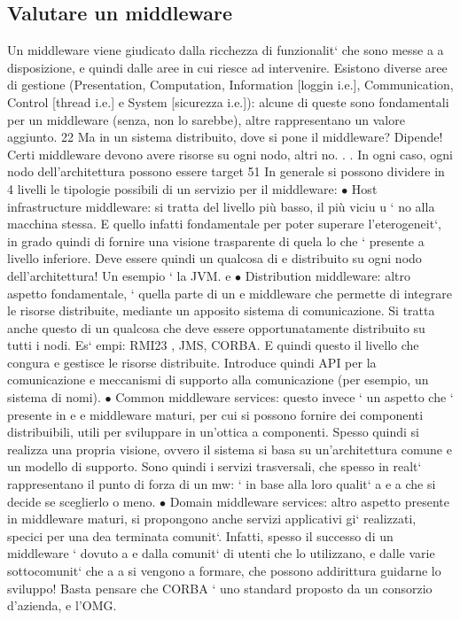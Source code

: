 \documentclass[a4paper,12pt]{article}
\begin{document}
\subsection{Valutare un middleware}
Un middleware viene giudicato dalla ricchezza di funzionalit` che sono messe a
a
disposizione, e quindi dalle aree in cui riesce ad intervenire. Esistono diverse
aree di gestione (Presentation, Computation, Information [loggin i.e.], Communication, Control [thread i.e.] e System
[sicurezza i.e.]): alcune di queste sono
fondamentali per un middleware (senza, non lo sarebbe), altre rappresentano
un valore aggiunto.
22 Ma in un sistema distribuito, dove si pone il middleware? Dipende! Certi middleware
devono avere risorse su ogni nodo, altri no. . . In ogni caso, ogni nodo dell'architettura possono
essere target
51
In generale si possono dividere in 4 livelli le tipologie possibili di un servizio
per il middleware:
$\bullet$ Host infrastructure middleware: si tratta del livello più basso, il più viciu
u
`
no alla macchina stessa. E quello infatti fondamentale per poter superare
l'eterogeneit`, in grado quindi di fornire una visione trasparente di quela
lo che ` presente a livello inferiore. Deve essere quindi un qualcosa di
e
distribuito su ogni nodo dell'architettura! Un esempio ` la JVM.
e
$\bullet$ Distribution middleware: altro aspetto fondamentale, ` quella parte di un
e
middleware che permette di integrare le risorse distribuite, mediante un
apposito sistema di comunicazione. Si tratta anche questo di un qualcosa che deve essere opportunatamente distribuito su
tutti i nodi. Es`
empi: RMI23 , JMS, CORBA. E quindi questo il livello che congura e
gestisce le risorse distribuite. Introduce quindi API per la comunicazione
e meccanismi di supporto alla comunicazione (per esempio, un sistema di
nomi).
$\bullet$ Common middleware services: questo invece ` un aspetto che ` presente in
e
e
middleware maturi, per cui si possono fornire dei componenti distribuibili,
utili per sviluppare in un'ottica a componenti. Spesso quindi si realizza
una propria visione, ovvero il sistema si basa su un'architettura comune
e un modello di supporto. Sono quindi i servizi trasversali, che spesso in
realt` rappresentano il punto di forza di un mw: ` in base alla loro qualit`
a
e
a
che si decide se sceglierlo o meno.
$\bullet$ Domain middleware services: altro aspetto presente in middleware maturi,
si propongono anche servizi applicativi gi` realizzati, specici per una dea
terminata comunit`. Infatti, spesso il successo di un middleware ` dovuto
a
e
dalla comunit` di utenti che lo utilizzano, e dalle varie sottocomunit` che
a
a
si vengono a formare, che possono addirittura guidarne lo sviluppo! Basta
pensare che CORBA ` uno standard proposto da un consorzio d'azienda,
e
l'OMG.
\end{document}

